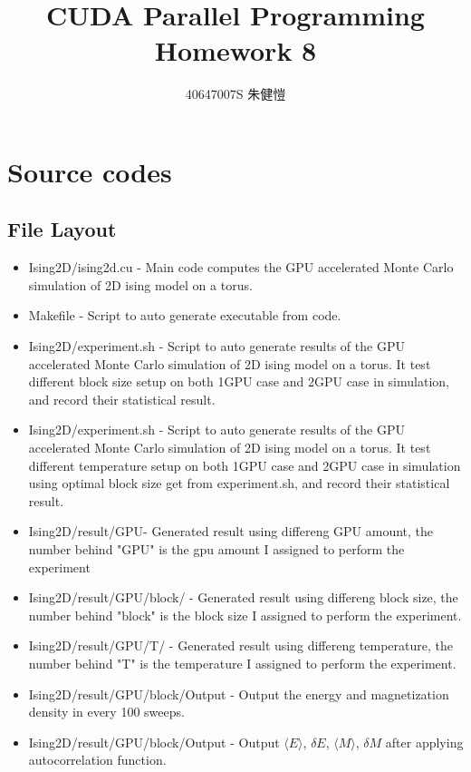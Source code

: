 \documentclass{article}
\title{CUDA Parallel Programming\\Homework 8}
\author{40647007S 朱健愷}
\begin{document}
	\maketitle
	\section{Source codes}
	\subsection{File Layout}
	\begin{itemize}
		\item Ising2D/ising2d.cu - Main code computes the GPU accelerated Monte Carlo simulation of 2D ising model on a torus.
		\item Makefile - Script to auto generate executable from code.
		\item Ising2D/experiment.sh - Script to auto generate results of the GPU accelerated Monte Carlo simulation of 2D ising model on a torus. It test different block size setup on both 1GPU case and 2GPU case in simulation, and record their statistical result.
		\item Ising2D/experiment.sh - Script to auto generate results of the GPU accelerated Monte Carlo simulation of 2D ising model on a torus. It test different temperature setup on both 1GPU case and 2GPU case in simulation using optimal block size get from experiment.sh, and record their statistical result.
		\item Ising2D/result/GPU\textunderscore* - Generated result using differeng GPU amount, the number behind "GPU" is the gpu amount I assigned to perform the experiment
		\item Ising2D/result/GPU\textunderscore*/block\textunderscore{*}/ - Generated result using differeng block size, the number behind "block" is the block size I assigned to perform the experiment.
		\item Ising2D/result/GPU\textunderscore*/T\textunderscore{*}/ - Generated result using differeng temperature, the number behind "T" is the temperature I assigned to perform the experiment.
		\item Ising2D/result/GPU\textunderscore*/block\textunderscore{*}/Output - Output the energy and magnetization density in every 100 sweeps.
		\item Ising2D/result/GPU\textunderscore*/block\textunderscore{*}/Output - Output $\langle E\rangle$, $\delta E$, $\langle M\rangle$, $\delta M$ after applying autocorrelation function.

\end{itemize}
\end{document}
